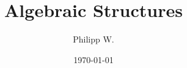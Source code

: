 \documentclass{article}
\begin{document}
\title{Algebraic Structures}
\author{Philipp W.}
\date{\today}
\maketitle
\tableofcontents
\clearpage


\clearpage


\clearpage


\clearpage


\clearpage


\clearpage
\end{document}
